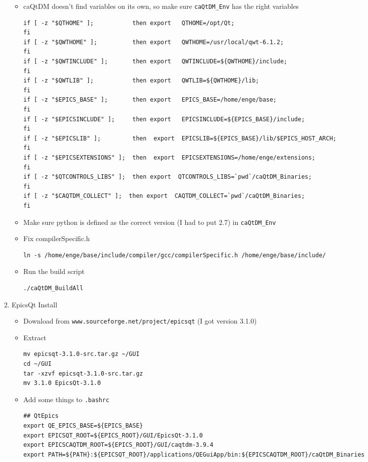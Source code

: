 \documentclass[11pt]{article}
\begin{document}
\begin{enumerate}
\begin{itemize}
\begin{verbatim}
\end{verbatim}
\item caQtDM doesn't find variables on its own, so make sure
      \verb~caQtDM_Env~ has the right variables
\begin{verbatim}
if [ -z "$QTHOME" ];           then export   QTHOME=/opt/Qt;
fi
if [ -z "$QWTHOME" ];          then export   QWTHOME=/usr/local/qwt-6.1.2;
fi
if [ -z "$QWTINCLUDE" ];       then export   QWTINCLUDE=${QWTHOME}/include;
fi
if [ -z "$QWTLIB" ];           then export   QWTLIB=${QWTHOME}/lib;
fi
if [ -z "$EPICS_BASE" ];       then export   EPICS_BASE=/home/enge/base;
fi
if [ -z "$EPICSINCLUDE" ];     then export   EPICSINCLUDE=${EPICS_BASE}/include;
fi
if [ -z "$EPICSLIB" ];         then  export  EPICSLIB=${EPICS_BASE}/lib/$EPICS_HOST_ARCH;
fi
if [ -z "$EPICSEXTENSIONS" ];  then  export  EPICSEXTENSIONS=/home/enge/extensions;
fi
if [ -z "$QTCONTROLS_LIBS" ];  then export  QTCONTROLS_LIBS=`pwd`/caQtDM_Binaries;
fi
if [ -z "$CAQTDM_COLLECT" ];  then export  CAQTDM_COLLECT=`pwd`/caQtDM_Binaries;
fi
\end{verbatim}
\item Make sure python is defined as the correct version (I had to put
2.7) in \verb~caQtDM_Env~
\item Fix compilerSpecific.h
\begin{verbatim}
ln -s /home/enge/base/include/compiler/gcc/compilerSpecific.h /home/enge/base/include/
\end{verbatim}
\item Run the build script
\begin{verbatim}
./caQtDM_BuildAll
\end{verbatim}
\end{itemize}
\item EpicsQt Install
\label{sec-1-5-3}
\begin{itemize}
\item Download from \texttt{www.sourceforge.net/project/epicsqt} (I got version 3.1.0)
\item Extract
\begin{verbatim}
mv epicsqt-3.1.0-src.tar.gz ~/GUI
cd ~/GUI
tar -xzvf epicsqt-3.1.0-src.tar.gz
mv 3.1.0 EpicsQt-3.1.0
\end{verbatim}
\item Add some things to \verb~.bashrc~
\begin{verbatim}
## QtEpics
export QE_EPICS_BASE=${EPICS_BASE}
export EPICSQT_ROOT=${EPICS_ROOT}/GUI/EpicsQt-3.1.0
export EPICSCAQTDM_ROOT=${EPICS_ROOT}/GUI/caqtdm-3.9.4
export PATH=${PATH}:${EPICSQT_ROOT}/applications/QEGuiApp/bin:${EPICSCAQTDM_ROOT}/caQtDM_Binaries

\end{verbatim}
\end{itemize}
\end{enumerate}
\end{document}
